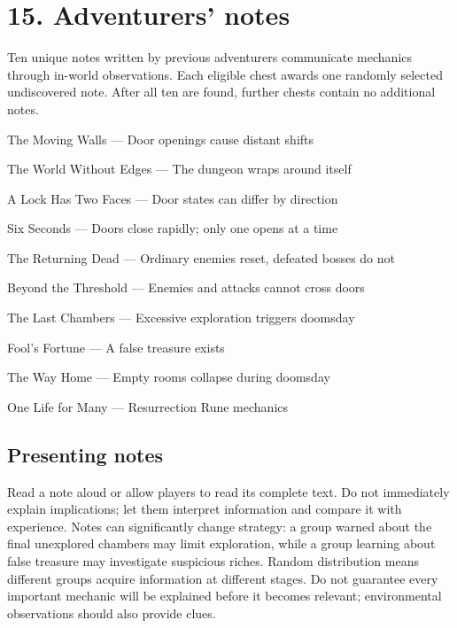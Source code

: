 \section{15. Adventurers' notes}

Ten unique notes written by previous adventurers communicate mechanics through in-world observations. Each eligible chest awards one randomly selected undiscovered note. After all ten are found, further chests contain no additional notes.

The Moving Walls — Door openings cause distant shifts

The World Without Edges — The dungeon wraps around itself

A Lock Has Two Faces — Door states can differ by direction

Six Seconds — Doors close rapidly; only one opens at a time

The Returning Dead — Ordinary enemies reset, defeated bosses do not

Beyond the Threshold — Enemies and attacks cannot cross doors

The Last Chambers — Excessive exploration triggers doomsday

Fool's Fortune — A false treasure exists

The Way Home — Empty rooms collapse during doomsday

One Life for Many — Resurrection Rune mechanics

\subsection{Presenting notes}

Read a note aloud or allow players to read its complete text. Do not immediately explain implications; let them interpret information and compare it with experience. Notes can significantly change strategy: a group warned about the final unexplored chambers may limit exploration, while a group learning about false treasure may investigate suspicious riches. Random distribution means different groups acquire information at different stages. Do not guarantee every important mechanic will be explained before it becomes relevant; environmental observations should also provide clues.
